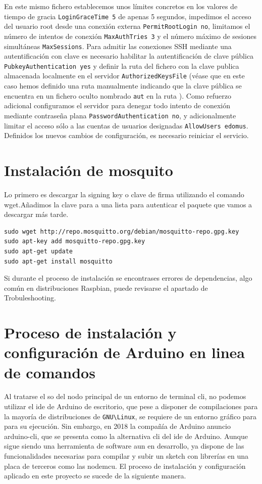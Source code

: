 \vspace{1cm}

En este mismo fichero establecemos unos límites concretos en los valores de tiempo de gracia \verb|LoginGraceTime 5| de apenas 5 segundos, impedimos el acceso del usuario root desde una conexión externa \verb|PermitRootLogin no|, limitamos el número de intentos de conexión \verb|MaxAuthTries 3| y el número máximo de sesiones simultáneas \verb|MaxSessions|. Para admitir las conexiones SSH mediante una autentificación con clave es necesario habilitar la autentificación de clave pública \verb|PubkeyAuthentication yes| y definir la ruta del fichero con la clave publica almacenada localmente en el servidor \verb|AuthorizedKeysFile|  (véase que en este caso hemos definido una ruta manualmente indicando que la clave pública se encuentra en un fichero oculto nombrado \verb|aut| en la ruta ). Como refuerzo adicional configuramos el servidor para denegar todo intento de conexión mediante contraseña plana \verb|PasswordAuthentication no|, y adicionalmente limitar el acceso sólo a las cuentas de usuarios designadas \verb|AllowUsers edomus|. Definidos los nuevos cambios de configuración, es necesario reiniciar el servicio.


\label{AppendiA:Key3}
\section{Instalación de mosquito}
Lo primero es descargar la signing key o clave de firma utilizando el comando wget.Añadimos la clave para a una lista para autenticar el paquete que vamos a descargar más tarde.

\begin{verbatim}
sudo wget http://repo.mosquitto.org/debian/mosquitto-repo.gpg.key
sudo apt-key add mosquitto-repo.gpg.key
sudo apt-get update 
sudo apt-get install mosquitto
\end{verbatim}

Si durante el proceso de instalación se encontrases errores de dependencias, algo común en distribuciones Raspbian, puede revisarse el apartado de Trobuleshooting.


\section{Proceso de instalación y configuración de Arduino en linea de comandos}
\label{AppendiA:Key4}

Al tratarse el \gls{so} del nodo principal de un entorno de terminal \gls{cli}, no podemos utilizar el \gls{ide} de Arduino de escritorio, que pese a disponer de compilaciones para la mayoría de distribuciones de \verb|GNU\Linux|, se requiere de un entorno gráfico para  para su ejecución. Sin embargo, en 2018 la compañía de Arduino anuncio arduino-cli, que se presenta como la alternativa \gls{cli} del \gls{ide} de Arduino. Aunque sigue siendo una herramienta de software aun en desarrollo, ya dispone de las funcionalidades necesarias para compilar y subir un sketch con librerías en una placa de terceros como las nodemcu. El proceso de instalación y configuración aplicado en este proyecto se sucede de la siguiente manera.

